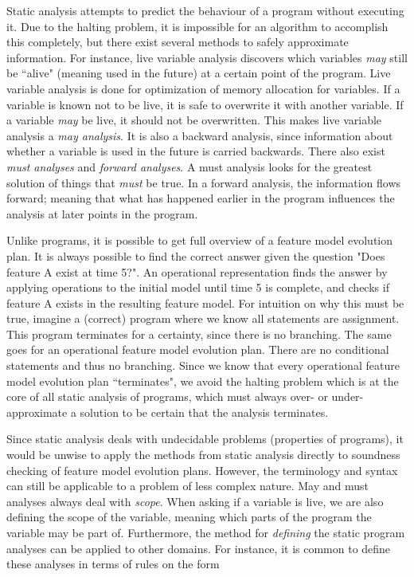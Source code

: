Static analysis attempts to predict the behaviour of a program without executing it. Due to the halting problem, it is impossible for an algorithm to accomplish this completely, but there exist several methods to safely approximate information. For instance, live variable analysis discovers which variables \emph{may} still be ``alive" (meaning used in the future) at a certain point of the program. Live variable analysis is done for optimization of memory allocation for variables. If a variable is known not to be live, it is safe to overwrite it with another variable. If a variable \emph{may} be live, it should not be overwritten. This makes live variable analysis a \emph{may analysis}. It is also a backward analysis, since information about whether a variable is used in the future is carried backwards. There also exist \emph{must analyses} and \emph{forward analyses}. A must analysis looks for the greatest solution of things that \emph{must} be true. In a forward analysis, the information flows forward; meaning that what has happened earlier in the program influences the analysis at later points in the program.

Unlike programs, it is possible to get full overview of a feature model evolution plan. It is always possible to find the correct answer given the question "Does feature A exist at time 5?". An operational representation finds the answer by applying operations to the initial model until time 5 is complete, and checks if feature A exists in the resulting feature model. For intuition on why this must be true, imagine a (correct) program where we know all statements are assignment. This program terminates for a certainty, since there is no branching. The same goes for an operational feature model evolution plan. There are no conditional statements and thus no branching. Since we know that every operational feature model evolution plan ``terminates", we avoid the halting problem which is at the core of all static analysis of programs, which must always over- or under-approximate a solution to be certain that the analysis terminates.

Since static analysis deals with undecidable problems (properties of programs), it would be unwise to apply the methods from static analysis directly to soundness checking of feature model evolution plans. However, the terminology and syntax can still be applicable to a problem of less complex nature. May and must analyses always deal with \emph{scope}. When asking if a variable is live, we are also defining the scope of the variable, meaning which parts of the program the variable may be part of. Furthermore, the method for \emph{defining} the static program analyses can be applied to other domains. For instance, it is common to define these analyses in terms of rules on the form


